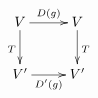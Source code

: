 \documentclass[12pt]{jlreq}
\begin{document}
\[
\xymatrix{
  V \ar[r]^{D(g)} \ar[d]_{T} & V \ar[d]^{T} \\
  V' \ar[r]_{D'(g)} & V'
}
\]
\end{document}
